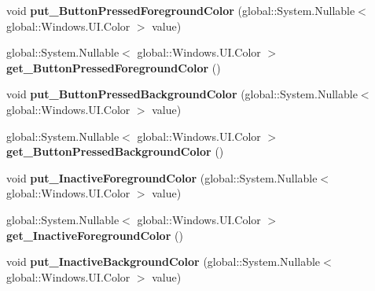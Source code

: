 \begin{DoxyCompactItemize}
void {\bfseries put\+\_\+\+Button\+Pressed\+Foreground\+Color} (global\+::\+System.\+Nullable$<$ global\+::\+Windows.\+U\+I.\+Color $>$ value)
\item 
\mbox{\label{class_windows_1_1_u_i_1_1_view_management_1_1_application_view_title_bar_a59124291680af5093b2aa92987f61c76}} 
global\+::\+System.\+Nullable$<$ global\+::\+Windows.\+U\+I.\+Color $>$ {\bfseries get\+\_\+\+Button\+Pressed\+Foreground\+Color} ()
\item 
\mbox{\label{class_windows_1_1_u_i_1_1_view_management_1_1_application_view_title_bar_ac6b52566c45f42efc81c9a0e973afa85}} 
void {\bfseries put\+\_\+\+Button\+Pressed\+Background\+Color} (global\+::\+System.\+Nullable$<$ global\+::\+Windows.\+U\+I.\+Color $>$ value)
\item 
\mbox{\label{class_windows_1_1_u_i_1_1_view_management_1_1_application_view_title_bar_af882393a152b9df371e3781f739cabac}} 
global\+::\+System.\+Nullable$<$ global\+::\+Windows.\+U\+I.\+Color $>$ {\bfseries get\+\_\+\+Button\+Pressed\+Background\+Color} ()
\item 
\mbox{\label{class_windows_1_1_u_i_1_1_view_management_1_1_application_view_title_bar_ab42ad105c4bc400b515275e8802c38ad}} 
void {\bfseries put\+\_\+\+Inactive\+Foreground\+Color} (global\+::\+System.\+Nullable$<$ global\+::\+Windows.\+U\+I.\+Color $>$ value)
\item 
\mbox{\label{class_windows_1_1_u_i_1_1_view_management_1_1_application_view_title_bar_a5258d150c16f577f11ca52e8b41ba734}} 
global\+::\+System.\+Nullable$<$ global\+::\+Windows.\+U\+I.\+Color $>$ {\bfseries get\+\_\+\+Inactive\+Foreground\+Color} ()
\item 
\mbox{\label{class_windows_1_1_u_i_1_1_view_management_1_1_application_view_title_bar_aa912163f22981533bcaf244d367a36e0}} 
void {\bfseries put\+\_\+\+Inactive\+Background\+Color} (global\+::\+System.\+Nullable$<$ global\+::\+Windows.\+U\+I.\+Color $>$ value)

\end{DoxyCompactItemize}
